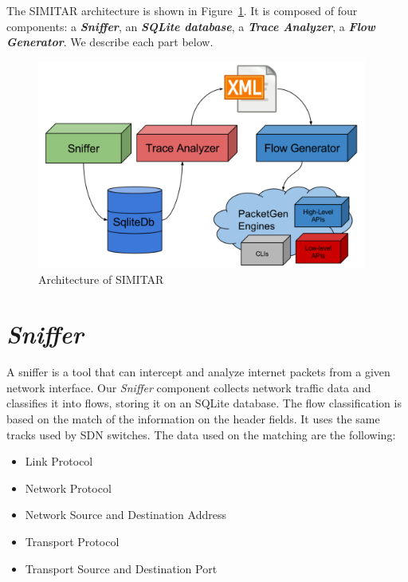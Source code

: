 The SIMITAR architecture is shown in Figure~\ref{fig:architecture}. It is composed of four components: a \textbf{\textit{Sniffer}}, an \textbf{\textit{SQLite database}}, a \textbf{\textit{Trace Analyzer}}, a \textbf{\textit{Flow Generator}}. We describe each part below.

\begin{figure}[ht!]
        \centering
        \includegraphics[height=2.7in]{figures/ch3/architecture-diagram}
        \caption{Architecture of SIMITAR}
    \label{fig:architecture}
\end{figure}

\section{ \textit{Sniffer} }


A sniffer is a tool that can intercept and analyze internet packets from a given network interface. Our \textit{Sniffer} component collects network traffic data and classifies it into flows, storing it on an SQLite database. The flow classification is based on the match of the information on the header fields. It uses the same tracks used by SDN  switches\cite{sdn-survey}. The data used on the matching are the following:

\begin{itemize}
\item Link Protocol
\item Network Protocol
\item Network Source and Destination Address
\item Transport Protocol
\item Transport Source and Destination Port
\end{itemize}


